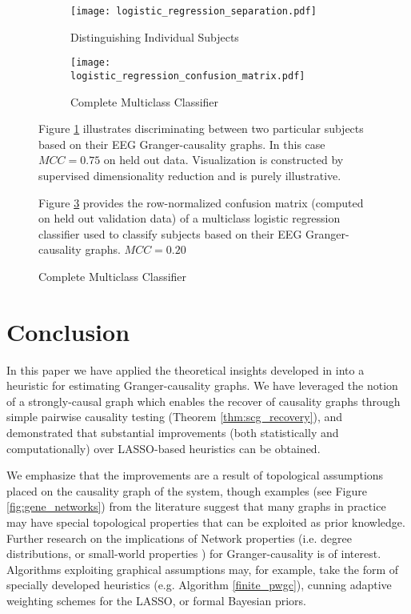 \documentclass[12pt]{article}
\begin{document}
\begin{figure}
  \centering
  \caption{Subject Classification from Granger-causality Graphs}
  \begin{subfigure}[b]{0.45\textwidth}
    \caption{Distinguishing Individual Subjects}
    \label{fig:logistic_regression_2pair}
    \texttt{[image: logistic\_regression\_separation.pdf]}
  \end{subfigure}
  \begin{subfigure}[b]{0.45\textwidth}
    \caption{Complete Multiclass Classifier}
    \label{fig:logistic_regression_results}
    \texttt{[image: logistic\_regression\_confusion\_matrix.pdf]}

    {\scriptsize }
  \end{subfigure}

  {\scriptsize Figure \ref{fig:logistic_regression_2pair} illustrates
    discriminating between two particular subjects based on their
    EEG Granger-causality graphs.  In this case $MCC = 0.75$ on held
    out data.  Visualization is constructed by supervised
    dimensionality reduction and is purely illustrative.

    Figure \ref{fig:logistic_regression_results} provides the
    row-normalized confusion matrix (computed on held out validation
    data) of a multiclass logistic regression classifier used to
    classify subjects based on their EEG Granger-causality graphs.  $MCC = 0.20$}

\end{figure}

\section{Conclusion}
\label{sec:conclusion}
In this paper we have applied the theoretical insights developed in
\cite{my_GC_paper} into a heuristic for estimating Granger-causality
graphs.  We have leveraged the notion of a strongly-causal graph which
enables the recover of causality graphs through simple pairwise
causality testing (Theorem \ref{thm:scg_recovery}), and demonstrated
that substantial improvements (both statistically and computationally)
over LASSO-based heuristics can be obtained.

We emphasize that the improvements are a result of topological
assumptions placed on the causality graph of the system, though
examples (see Figure \ref{fig:gene_networks}) from the literature
suggest that many graphs in practice may have special topological
properties that can be exploited as prior knowledge.  Further research
on the implications of Network properties (i.e. degree distributions,
or small-world properties ) for
Granger-causality is of interest.  Algorithms exploiting graphical
assumptions may, for example, take the form of specially developed
heuristics (e.g. Algorithm \ref{finite_pwgc}), cunning adaptive
weighting schemes for the LASSO, or formal Bayesian priors.
\end{document}
